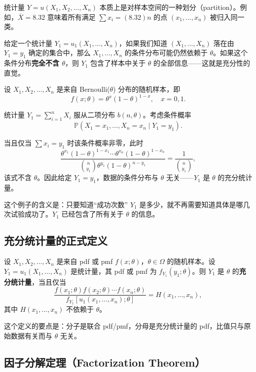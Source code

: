 统计量 $Y = u(X_1, X_2, \ldots, X_n)$ 本质上是对样本空间的一种划分（partition）。例如，$\overline{X} = 8.32$ 意味着所有满足 $\sum x_i = (8.32)n$ 的点 $(x_1, \ldots, x_n)$ 被归入同一类。

给定一个统计量 $Y_1 = u_1(X_1, \ldots, X_n)$，如果我们知道 $(X_1, \ldots, X_n)$ 落在由 $Y_1 = y_1$ 确定的集合中，那么 $X_1, \ldots, X_n$ 的条件分布可能仍然依赖于 $\theta$。如果这个条件分布\textbf{完全不含 $\theta$}，则 $Y_1$ 包含了样本中关于 $\theta$ 的全部信息——这就是充分性的直觉。

\begin{example}[二项分布的充分统计量]\label{ex:binomial-sufficient}
设 $X_1, X_2, \ldots, X_n$ 是来自 Bernoulli($\theta$) 分布的随机样本，即
\[
f(x; \theta) = \theta^x (1-\theta)^{1-x},\quad x = 0,1.
\]

统计量 $Y_1 = \sum_{i=1}^n X_i$ 服从二项分布 $b(n, \theta)$。考虑条件概率
\[
\mathbb{P}(X_1 = x_1, \ldots, X_n = x_n \mid Y_1 = y_1).
\]

当且仅当 $\sum x_i = y_1$ 时该条件概率非零，此时
\[
\frac{\theta^{x_1}(1-\theta)^{1-x_1} \cdots \theta^{x_n}(1-\theta)^{1-x_n}}{\binom{n}{y_1}\theta^{y_1}(1-\theta)^{n-y_1}} = \frac{1}{\binom{n}{y_1}},
\]
该式不含 $\theta$。因此给定 $Y_1 = y_1$，数据的条件分布与 $\theta$ 无关——$Y_1$ 是 $\theta$ 的充分统计量。
\end{example}

这个例子的含义是：只要知道``成功次数'' $Y_1$ 是多少，就不再需要知道具体是哪几次试验成功了。$Y_1$ 已经包含了所有关于 $\theta$ 的信息。

\subsection{充分统计量的正式定义}

\begin{definition}[充分统计量]\label{def:sufficient-statistic}
设 $X_1, X_2, \ldots, X_n$ 是来自 pdf 或 pmf $f(x; \theta)$，$\theta \in \Omega$ 的随机样本。设 $Y_1 = u_1(X_1, \ldots, X_n)$ 是统计量，其 pdf 或 pmf 为 $f_{Y_1}(y_1; \theta)$。则 $Y_1$ 是 $\theta$ 的\textbf{充分统计量}，当且仅当
\[
\frac{f(x_1; \theta)f(x_2; \theta)\cdots f(x_n; \theta)}{f_{Y_1}[u_1(x_1, \ldots, x_n); \theta]} = H(x_1, \ldots, x_n),
\]
其中 $H(x_1, \ldots, x_n)$ 不依赖于 $\theta$。
\end{definition}

这个定义的要点是：分子是联合 pdf/pmf，分母是充分统计量的 pdf，比值只与原始数据有关而与 $\theta$ 无关。

\subsection{因子分解定理（Factorization Theorem）}

